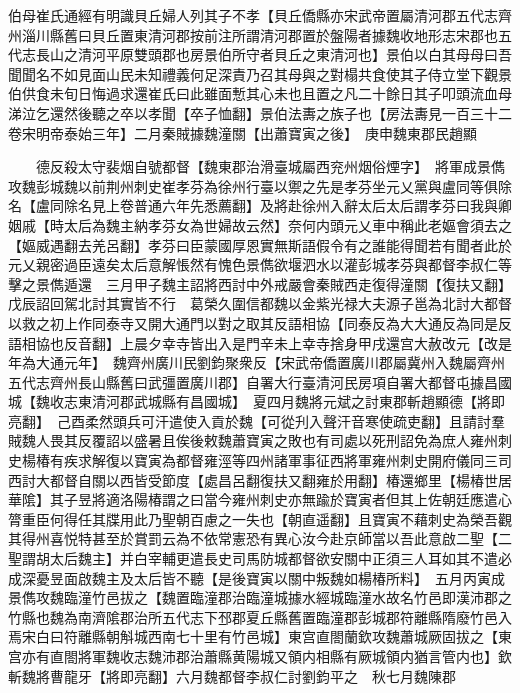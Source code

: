 伯母崔氏通經有明識貝丘婦人列其子不孝【貝丘僑縣亦宋武帝置屬清河郡五代志齊州淄川縣舊曰貝丘置東清河郡按前注所謂清河郡置於盤陽者據魏收地形志宋郡也五代志長山之清河平原雙頭郡也房景伯所守者貝丘之東清河也】景伯以白其母母曰吾聞聞名不如見面山民未知禮義何足深責乃召其母與之對榻共食使其子侍立堂下觀景伯供食未旬日悔過求還崔氏曰此雖面慙其心未也且置之凡二十餘日其子叩頭流血母涕泣乞還然後聽之卒以孝聞【卒子恤翻】景伯法夀之族子也【房法夀見一百三十二卷宋明帝泰始三年】二月秦賊據魏潼關【出蕭寶寅之後】　庚申魏東郡民趙顯

　　德反殺太守裴烟自號都督【魏東郡治滑臺城屬西兖州烟俗煙字】　將軍成景儁攻魏彭城魏以前荆州刺史崔孝芬為徐州行臺以禦之先是孝芬坐元乂黨與盧同等俱除名【盧同除名見上卷普通六年先悉薦翻】及將赴徐州入辭太后太后謂孝芬曰我與卿姻戚【時太后為魏主納孝芬女為世婦故云然】奈何内頭元乂車中稱此老嫗會須去之【嫗威遇翻去羌呂翻】孝芬曰臣蒙國厚恩實無斯語假令有之誰能得聞若有聞者此於元乂親密過臣遠矣太后意解悵然有愧色景儁欲堰泗水以灌彭城孝芬與都督李叔仁等擊之景儁遁還　三月甲子魏主詔將西討中外戒嚴會秦賊西走復得潼關【復扶又翻】戊辰詔回駕北討其實皆不行　葛榮久圍信都魏以金紫光禄大夫源子邕為北討大都督以救之初上作同泰寺又開大通門以對之取其反語相協【同泰反為大大通反為同是反語相協也反音翻】上晨夕幸寺皆出入是門辛未上幸寺捨身甲戌還宫大赦改元【改是年為大通元年】　魏齊州廣川民劉鈞聚衆反【宋武帝僑置廣川郡屬冀州入魏屬齊州五代志齊州長山縣舊曰武彊置廣川郡】自署大行臺清河民房項自署大都督屯據昌國城【魏收志東清河郡武城縣有昌國城】　夏四月魏將元斌之討東郡斬趙顯德【將即亮翻】　己酉柔然頭兵可汗遣使入貢於魏【可從刋入聲汗音寒使疏吏翻】且請討羣賊魏人畏其反覆詔以盛暑且俟後敕魏蕭寶寅之敗也有司處以死刑詔免為庶人雍州刺史楊椿有疾求解復以寶寅為都督雍涇等四州諸軍事征西將軍雍州刺史開府儀同三司西討大都督自關以西皆受節度【處昌呂翻復扶又翻雍於用翻】椿還鄉里【楊椿世居華隂】其子昱將適洛陽椿謂之曰當今雍州刺史亦無踰於寶寅者但其上佐朝廷應遣心膂重臣何得任其牒用此乃聖朝百慮之一失也【朝直遥翻】且寶寅不藉刺史為榮吾觀其得州喜悦特甚至於賞罰云為不依常憲恐有異心汝今赴京師當以吾此意啟二聖【二聖謂胡太后魏主】并白宰輔更遣長史司馬防城都督欲安關中正須三人耳如其不遣必成深憂昱面啟魏主及太后皆不聽【是後寶寅以關中叛魏如楊椿所料】　五月丙寅成景儁攻魏臨潼竹邑拔之【魏置臨潼郡治臨潼城據水經城臨潼水故名竹邑即漢沛郡之竹縣也魏為南濟隂郡治所五代志下邳郡夏丘縣舊置臨潼郡彭城郡符離縣隋廢竹邑入焉宋白曰符離縣朝斛城西南七十里有竹邑城】東宫直閤蘭欽攻魏蕭城厥固拔之【東宫亦有直閤將軍魏收志魏沛郡治蕭縣黄陽城又領内相縣有厥城領内猶言管内也】欽斬魏將曹龍牙【將即亮翻】六月魏都督李叔仁討劉鈞平之　秋七月魏陳郡

